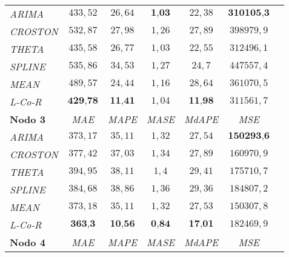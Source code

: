 \documentclass[runningheads]{llncs}
\begin{document}
\begin{table}
\begin{center}
\begin{tabular}{|l|c|c|c|c|c|c|}
\emph{ARIMA } & $433,52$ & $26,64$ & $\textbf{1,03}$ & $22,38$ & $\textbf{310105,3}$ \\%
\emph{CROSTON } & $532,87$ & $27,98$ & $1,26$ & $27,89$ & $398979,9$ \\%
\emph{THETA } & $435,58$ & $26,77$ & $1,03$ & $22,55$ & $312496,1$ \\%
\emph{SPLINE } & $535,86$ & $34,53$ & $1,27$ & $24,7$ & $447557,4$ \\%
\emph{MEAN } & $489,57$ & $24,44$ & $1,16$ & $28,64$ & $361070,5$ \\%
\emph{L-Co-R} & $\textbf{429,78}$ & $\textbf{11,41}$ & $1,04$ & $\textbf{11,98}$ & $311561,7$ \\%

\hline 
 \hline 
\textbf{Nodo 3} & \emph{MAE} & \emph{MAPE} & \emph{MASE} & \emph{MdAPE} & \emph{MSE} \\%
\hline

\emph{ARIMA } & $373,17$ & $35,11$ & $1,32$ & $27,54$ & $\textbf{150293,6}$ \\%
\emph{CROSTON } & $377,42$ & $37,03$ & $1,34$ & $27,89$ & $160970,9$ \\%
\emph{THETA } & $394,95$ & $38,11$ & $1,4$ & $29,41$ & $175710,7$ \\%
\emph{SPLINE } & $384,68$ & $38,86$ & $1,36$ & $29,36$ & $184807,2$ \\%
\emph{MEAN } & $373,18$ & $35,11$ & $1,32$ & $27,53$ & $150307,8$ \\%
\emph{L-Co-R} & $\textbf{363,3}$ & $\textbf{10,56}$ & $\textbf{0,84}$ & $\textbf{17,01}$ &
$182469,9$ \\%
\hline 
 \hline 
 \textbf{Nodo 4}& \emph{MAE} & \emph{MAPE} & \emph{MASE} & \emph{MdAPE} & \emph{MSE} \\%
\hline


\end{tabular}
\end{center}
\end{table}
\end{document}
